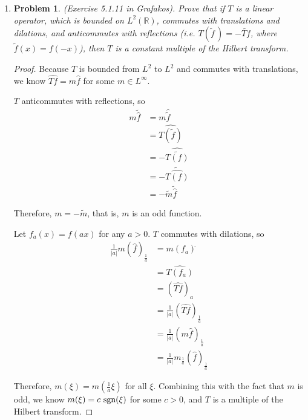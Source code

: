 \documentclass[a4paper]{article}
\newtheorem*{problem}{Problem}
\begin{document}
\begin{enumerate}
\begin{proof}
  \end{proof}

\item
  \begin{problem}
    (Exercise 5.1.11 in Grafakos). Prove that if $T$ is a linear operator, which is bounded on $L^2 (\mathbb R)$, commutes with translations and dilations, and anticommutes with reflections (i.e. $ T (\widetilde{f}\,) = - \widetilde{Tf}$, where $\widetilde{f} (x) = f (-x)$), then $T$ is a constant multiple of the Hilbert transform.
  \end{problem}

  \begin{proof}

    Because $T$ is bounded from $L^2$ to $L^2$ and commutes with translations, we know $\widehat{Tf} = m \widehat{f}$ for some $m \in L^\infty$.

    $T$ anticommutes with reflections, so
    \begin{align*}
      m \tilde{\widehat{f}} &= m \widehat{\tilde{f}} \\
      &= \widehat{T( \tilde{f} ) } \\
      &= - \widehat{ \tilde{T(f)} } \\
      &= - \tilde{ \widehat{T(f)} } \\
      &= - \tilde{m} \tilde{ \widehat{f} }
    \end{align*}

    Therefore, $m = - \tilde{m}$, that is, $m$ is an odd function.

    Let $f_a(x) = f(ax)$ for any $a>0$. $T$ commutes with dilations, so
    \begin{align*}
      \frac{1}{|a|} m \left( \widehat{f} \right)_{\frac{1}{a}} &= m (f_a)^{\widehat{}} \\
      &= \widehat{T(f_a)} \\
      &= \left( \widehat{Tf} \right)_a \\
      &= \frac{1}{|a|} \left( \widehat{Tf} \right)_{\frac{1}{a}} \\
      &= \frac{1}{|a|} ( m \widehat{f} )_{\frac{1}{a}} \\
      &= \frac{1}{|a|} m_{\frac{1}{a}} ( \widehat{f} )_{\frac{1}{a}}
    \end{align*}

    Therefore, $m(\xi) = m(\frac{1}{a} \xi)$ for all $\xi$. Combining this with the fact that $m$ is odd, we know $m(\xi) = c \textup{ sgn} (\xi)$ for
    some $c>0$, and $T$ is a multiple of the Hilbert transform.


\end{proof}
\end{enumerate}
\end{document}
